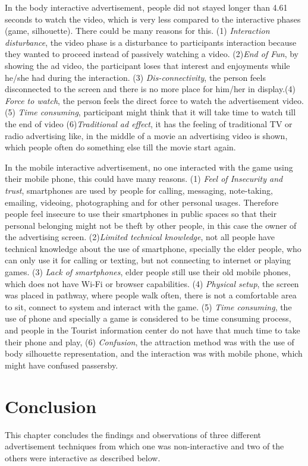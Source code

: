 In the body interactive advertisement, people did not stayed longer than 4.61 seconds to watch the video, which is very less compared to the interactive phases (game, silhouette). There could be many reasons for this. (1) \emph{Interaction disturbance}, the video phase is a disturbance to participants interaction because they wanted to proceed instead of passively watching a video. (2)\emph{End of Fun}, by showing the ad video, the participant loses that interest and enjoyments while he/she had during the interaction. (3) \emph{Dis-connectivity}, the person feels disconnected to the screen and there is no more place for him/her in display.(4) \emph{Force to watch}, the person feels the direct force to watch the advertisement video. (5) \emph{Time consuming}, participant might think that it will take time to watch till the end of video  (6)\emph{Traditional ad effect}, it has the feeling of traditional TV or radio advertising like, in the middle of a movie an advertising video is shown, which people often do something else till the movie start again.

In the mobile interactive advertisement, no one interacted with the game using their mobile phone, this could have many reasons. (1) \emph{Feel of Insecurity and trust}, smartphones are used by people for calling, messaging, note-taking, emailing, videoing, photographing and for other personal usages. Therefore people feel insecure to use their smartphones in public spaces so that their personal belonging might not be theft by other people, in this case the owner of the advertising screen. (2)\emph{Limited technical knowledge}, not all people have technical knowledge about the use of smartphone, specially the elder people, who can only use it for calling or texting, but not connecting to internet or playing games. (3) \emph{Lack of smartphones}, elder people still use their old mobile phones, which does not have Wi-Fi or browser capabilities. (4) \emph{Physical setup}, the screen was placed in pathway, where people walk often, there is not a comfortable area to sit, connect to system and interact with the game. (5) \emph{Time consuming}, the use of phone and specially a game is considered to be time consuming process, and people in the Tourist information center do not have that much time to take their phone and play, (6) \emph{Confusion}, the attraction method was with the use of body silhouette representation, and the interaction was with mobile phone, which might have confused passersby. 


\section{Conclusion}
This chapter concludes the findings and observations of three different advertisement techniques from which one was non-interactive and two of the others were interactive as described below.

